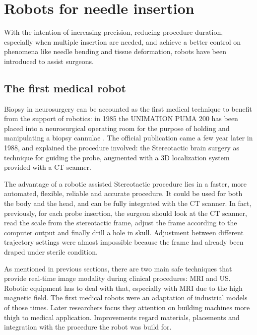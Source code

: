 \section{Robots for needle insertion}
With the intention of increasing precision, reducing procedure duration, especially when multiple insertion are needed, and achieve a better control on phenomena like needle bending and tissue deformation, robots have been introduced to assist surgeons.
\subsection{The first medical robot}
Biopsy in neurosurgery can be accounted as the first medical technique to benefit from the support of robotics: in 1985 the UNIMATION PUMA 200 has been placed into a neurosurgical operating room for the purpose of holding and manipulating a biopsy cannulae \cite{Kwoh1988}.
The official publication came a few year later in 1988, and explained the procedure involved: the Stereotactic brain surgery as technique for guiding the probe, augmented with a 3D localization system provided with a CT scanner.

The advantage of a robotic assisted Stereotactic procedure lies in a faster, more automated, flexible, reliable and accurate procedure. It could be used for both the body and the head, and can be fully integrated with the CT scanner.
In fact, previously, for each probe insertion, the surgeon should look at the CT scanner, read the scale from the stereotactic frame, adjust the frame according to the computer output and finally drill a hole in skull.%
Adjustment between different trajectory settings were almost impossible because the frame had already been draped under sterile condition.

As mentioned in previous sections, there are two main safe techniques that provide real-time image modality during clinical procedures: MRI and US.
Robotic equipment has to deal with that, especially with MRI due to the high magnetic field.
The first medical robots were an adaptation of industrial models of those times. Later researchers focus they attention on building machines more thigh to medical application. Improvements regard materials, placements and integration with the procedure the robot was build for.

